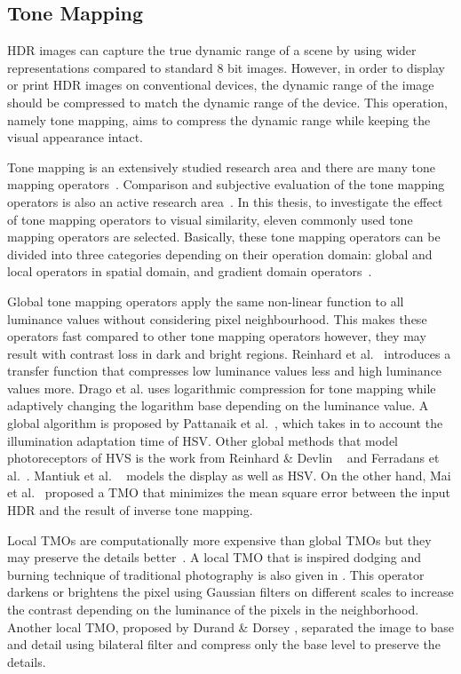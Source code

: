 \subsection{Tone Mapping}
HDR images can capture the true dynamic range of a scene by using wider representations compared to standard 8 bit images. However, in order to display or print HDR images on conventional devices, the dynamic range of the image should be compressed to match the dynamic range of the device. This operation, namely tone mapping, aims to compress the dynamic range while keeping the visual appearance intact. 

Tone mapping is an extensively studied research area and there are many tone mapping operators~\cite{Rein2010}. Comparison and subjective evaluation of the tone mapping operators is also an active research area~\cite{kundu2017large, krasula2016preference}. In this thesis, to investigate the effect of tone mapping operators to visual similarity, eleven commonly used tone mapping operators are selected. Basically, these tone mapping operators can be divided into three categories depending on their operation domain: global and local operators in spatial domain, and gradient domain operators~\cite{Rein2010}. 

Global tone mapping operators apply the same non-linear function to all luminance values without considering pixel neighbourhood. This makes these operators fast compared to other tone mapping operators however, they may result with contrast loss in dark and bright regions. Reinhard et al.~\cite{reinhard2002photographic} introduces a transfer function that compresses low luminance values less and high luminance values more. Drago et al. \cite{drago2003adaptive} uses logarithmic compression for tone mapping while adaptively changing the logarithm base depending on the luminance value. A global algorithm is proposed by Pattanaik et al.~\cite{pattanaik2000time}, which takes in to account the illumination adaptation time of HSV. Other global methods that model photoreceptors of HVS is the work from Reinhard \& Devlin ~\cite{reinhard2005dynamic} and Ferradans et al.~\cite{ferradans2011analysis}. Mantiuk et al. ~\cite{mantiuk2008display} models the display as well as HSV. On the other hand, Mai et al.~\cite{mai2010optimizing} proposed a TMO that minimizes the mean square error between the input HDR and the result of inverse tone mapping.

Local TMOs are computationally more expensive than global TMOs but they may preserve the details better~\cite{Rein2010}. A local TMO that is inspired dodging and burning technique of traditional photography is also given in \cite{reinhard2002photographic}. This operator darkens or brightens the pixel using Gaussian filters on different scales to increase the contrast  depending on the luminance of the pixels in the neighborhood. Another local TMO, proposed by Durand \& Dorsey \cite{durand2002fast}, separated the image to base and detail using bilateral filter and compress only the base level to preserve the details. 

